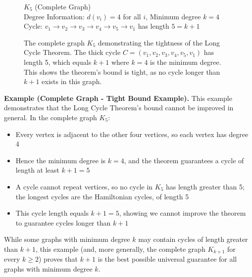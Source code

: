 \documentclass{article}
\theoremstyle{definition}
\begin{document}
\begin{figure}[h]
\centering
{}

\begin{center}
\small
$K_5$ (Complete Graph)\\
Degree Information: $d(v_i) = 4$ for all $i$, Minimum degree $k = 4$\\
Cycle: $v_1 \xrightarrow{} v_2 \xrightarrow{} v_3 \xrightarrow{} v_4 \xrightarrow{} v_5 \xrightarrow{} v_1$ has length $5 = k+1$
\end{center}

\caption{The complete graph $K_5$ demonstrating the tightness of the Long Cycle Theorem. The thick cycle $C = (v_1, v_2, v_3, v_4, v_5, v_1)$ has length 5, which equals $k+1$ where $k=4$ is the minimum degree. This shows the theorem's bound is tight, as no cycle longer than $k+1$ exists in this graph.}
\label{fig:k5-long-cycle-tight}
\end{figure}

\noindent\textbf{Example (Complete Graph - Tight Bound Example).}
This example demonstrates that the Long Cycle Theorem's bound cannot be improved in general. In the complete graph $K_5$:
\begin{itemize}
    \item Every vertex is adjacent to the other four vertices, so each vertex has degree 4
    \item Hence the minimum degree is $k=4$, and the theorem guarantees a cycle of length at least $k+1=5$
    \item A cycle cannot repeat vertices, so no cycle in $K_5$ has length greater than 5; the longest cycles are the Hamiltonian cycles, of length 5
    \item This cycle length equals $k+1=5$, showing we cannot improve the theorem to guarantee cycles longer than $k+1$
\end{itemize}
While some graphs with minimum degree $k$ may contain cycles of length greater than $k+1$, this example (and, more generally, the complete graph $K_{k+1}$ for every $k \geq 2$) proves that $k+1$ is the best possible universal guarantee for all graphs with minimum degree $k$.
\end{document}
